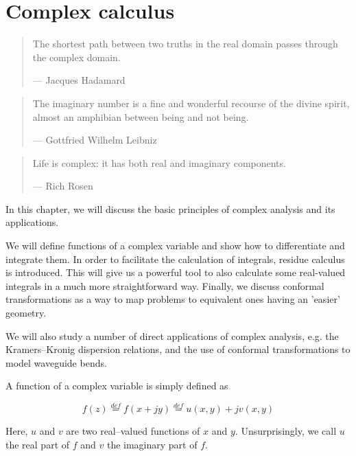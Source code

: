 \setchapterpreamble[u]{\margintoc}
\chapter{Complex calculus}
\label{h:complex}

\begin{quote}
The shortest path between two truths in the real domain passes through the complex domain.

--- Jacques Hadamard
\end{quote}

\begin{quote}
The imaginary number is a fine and wonderful recourse of the divine spirit, almost an amphibian between being and not being.

--- Gottfried Wilhelm Leibniz
\end{quote}

\begin{quote}
  Life is complex: it has both real and imaginary components.
  
--- Rich Rosen
\end{quote}

In this chapter, we will discuss the basic principles of complex analysis and its applications.

We will define functions of a complex variable and show how to differentiate and integrate them. In order to facilitate the calculation of integrals, residue calculus is introduced. This will give us a powerful tool to also calculate some real-valued integrals in a much more straightforward way. Finally, we discuss conformal transformations as a way to map problems to equivalent ones having an 'easier' geometry. 

We will also study a number of direct applications of complex analysis, e.g. the Kramers--Kronig dispersion relations, and the use of conformal transformations to model waveguide bends.


A function of a complex variable is simply defined as

\begin{equation}
f(z) \stackrel{def}{=} f(x + j y) \stackrel{def}{=}  u(x,y) + j v(x,y)
\end{equation}

Here, $u$ and $v$ are two real--valued functions of $x$ and $y$. Unsurprisingly, we call $u$ the real part of $f$ and $v$ the imaginary part of $f$.

